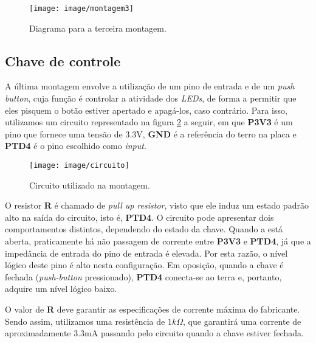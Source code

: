 \FloatBarrier

\begin{figure}[h]
    \centering
    \texttt{[image: image/montagem3]}
    
    \caption{Diagrama para a terceira montagem.}
    \label{fig:m3}
\end{figure} 

\FloatBarrier

\subsection{Chave de controle}

A última montagem envolve a utilização de um pino de entrada e de um
\textit{push button}, cuja função é controlar a atividade dos \textit{LEDs}, de
forma a permitir que eles pisquem o botão estiver apertado e apagá-los, caso
contrário. Para isso, utilizamos um circuito representado na figura
\ref{fig:circ} a seguir, em que \textbf{P3V3} é um pino que fornece uma tensão
de 3.3V, \textbf{GND} é a referência do terro na placa e \textbf{PTD4} é o pino
escolhido como \textit{input}.

\begin{figure}[h]
    \centering
    \texttt{[image: image/circuito]}
    
    \caption{Circuito utilizado na montagem.}
    \label{fig:circ}
\end{figure} 

O resistor \textbf{R} é chamado de \textit{pull up resistor}, visto que ele
induz um estado padrão alto na saída do circuito, isto é, \textbf{PTD4}. O
circuito pode apresentar dois comportamentos distintos, dependendo do
estado da chave. Quando a está aberta, praticamente há não passagem de
corrente entre \textbf{P3V3} e \textbf{PTD4}, já que a impedância de entrada do
pino de entrada é elevada. Por esta razão, o nível lógico deste
pino é alto nesta configuração. Em oposição, quando a chave é fechada
(\textit{push-button} pressionado), \textbf{PTD4} conecta-se ao terra e,
portanto, adquire um nível lógico baixo.

\vspace{12pt}

O valor de \textbf{R} deve garantir as especificações de corrente máxima do
fabricante. Sendo assim, utilizamos uma resistência de \(1k\Omega\), que
garantirá uma corrente de aproximadamente 3.3mA passando pelo circuito quando a
chave estiver fechada.

\vspace{12pt}

